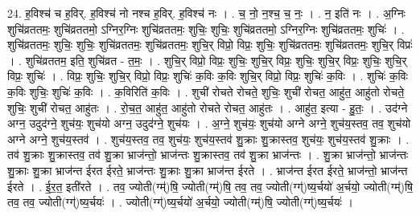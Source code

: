 \documentclass[17pt]{extarticle}
\begin{document}
24. ह॒विश्च॑ च ह॒विर्. ह॒विश्च॑ नो नश्च ह॒विर्. ह॒विश्च॑ नः । . च॒ नो॒ न॒श्च॒ च॒ नः॒ । . न॒ इति॑ नः । . अ॒ग्निः शुचि॑व्रततमः॒ शुचि॑व्रततमो॒ ऽग्निर॒ग्निः शुचि॑व्रततमः॒ शुचिः॒ शुचिः॒ शुचि॑व्रततमो॒ ऽग्निर॒ग्निः शुचि॑व्रततमः॒ शुचिः॑ । . शुचि॑व्रततमः॒ शुचिः॒ शुचिः॒ शुचि॑व्रततमः॒ शुचि॑व्रततमः॒ शुचि॒र् विप्रो॒ विप्रः॒ शुचिः॒ शुचि॑व्रततमः॒ शुचि॑व्रततमः॒ शुचि॒र् विप्रः॑ । . शुचि॑व्रततम॒ इति॒ शुचि॑व्रत - त॒मः॒ । . शुचि॒र् विप्रो॒ विप्रः॒ शुचिः॒ शुचि॒र् विप्रः॒ शुचिः॒ शुचि॒र् विप्रः॒ शुचिः॒ शुचि॒र् विप्रः॒ शुचिः॑ । . विप्रः॒ शुचिः॒ शुचि॒र् विप्रो॒ विप्रः॒ शुचिः॑ क॒विः क॒विः शुचि॒र् विप्रो॒ विप्रः॒ शुचिः॑ क॒विः । . शुचिः॑ क॒विः क॒विः शुचिः॒ शुचिः॑ क॒विः । . क॒विरिति॑ क॒विः । . शुची॑ रोचते रोचते॒ शुचिः॒ शुची॑ रोचत॒ आहु॑त॒ आहु॑तो रोचते॒ शुचिः॒ शुची॑ रोचत॒ आहु॑तः । . रो॒च॒त॒ आहु॑त॒ आहु॑तो रोचते रोचत॒ आहु॑तः । . आहु॑त॒ इत्या - हु॒तः॒ । . उद॑ग्ने अग्न॒ उदुद॑ग्ने॒ शुच॑यः॒ शुच॑यो अग्न॒ उदुद॑ग्ने॒ शुच॑यः । . अ॒ग्ने॒ शुच॑यः॒ शुच॑यो अग्ने अग्ने॒ शुच॑य॒स्तव॒ तव॒ शुच॑यो अग्ने अग्ने॒ शुच॑य॒स्तव॑ । . शुच॑य॒स्तव॒ तव॒ शुच॑यः॒ शुच॑य॒स्तव॑ शु॒क्राः शु॒क्रास्तव॒ शुच॑यः॒ शुच॑य॒स्तव॑ शु॒क्राः । . तव॑ शु॒क्राः शु॒क्रास्तव॒ तव॑ शु॒क्रा भ्राज॑न्तो॒ भ्राज॑न्तः शु॒क्रास्तव॒ तव॑ शु॒क्रा भ्राज॑न्तः । . शु॒क्रा भ्राज॑न्तो॒ भ्राज॑न्तः शु॒क्राः शु॒क्रा भ्राज॑न्त ईरत ईरते॒ भ्राज॑न्तः शु॒क्राः शु॒क्रा भ्राज॑न्त ईरते । . भ्राज॑न्त ईरत ईरते॒ भ्राज॑न्तो॒ भ्राज॑न्त ईरते । . ई॒र॒त॒ इती॑रते । . तव॒ ज्योती(ग्म्॑)षि॒ ज्योती(ग्म्॑)षि॒ तव॒ तव॒ ज्योती(ग्ग्॑)ष्य॒र्चयो॑ अ॒र्चयो॒ ज्योती(ग्म्॑)षि॒ तव॒ तव॒ ज्योती(ग्ग्॑)ष्य॒र्चयः॑ । . ज्योती(ग्ग्॑)ष्य॒र्चयो॑ अ॒र्चयो॒ ज्योती(ग्म्॑)षि॒ ज्योती(ग्ग्॑)ष्य॒र्चयः॑ । \newline
\end{document}
